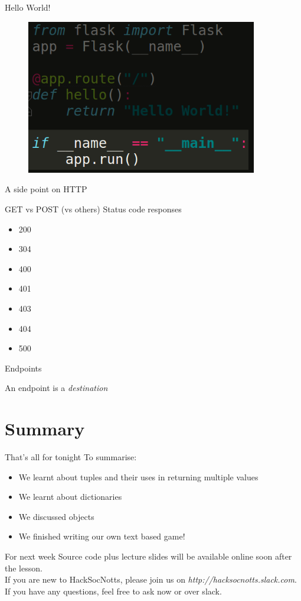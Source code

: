 \documentclass{beamer}
\begin{document}
\begin{frame}{Hello World!}

\begin{figure}[h]
\includegraphics[width=0.9\textwidth]{flask4}
\end{figure}

\end{frame}

\begin{frame}{A side point on HTTP}

\pause
GET vs POST (vs others)
\pause
Status code responses\pause
\begin{itemize}
  \item 200\pause
  \item 304\pause
  \item 400\pause
  \item 401\pause
  \item 403\pause
  \item 404\pause
  \item 500
  \end{itemize}

\end{frame}

\begin{frame}{Endpoints}

An endpoint is a \textit{destination} 


\end{frame}

\section{Summary}

\begin{frame}{That's all for tonight}
  To summarise:
  \pause
  \begin{itemize}
  \item We learnt about tuples and their uses in returning multiple values\pause
  \item We learnt about dictionaries\pause
  \item We discussed objects\pause
  \item We finished writing our own text based game!
  \end{itemize}
\end{frame}

\begin{frame}{For next week}
Source code plus lecture slides will be available online soon after the lesson.\\
If you are new to HackSocNotts, please join us on \textit{http://hacksocnotts.slack.com}.\\
If you have any questions, feel free to ask now or over slack.\\
\end{frame}
\end{document}
